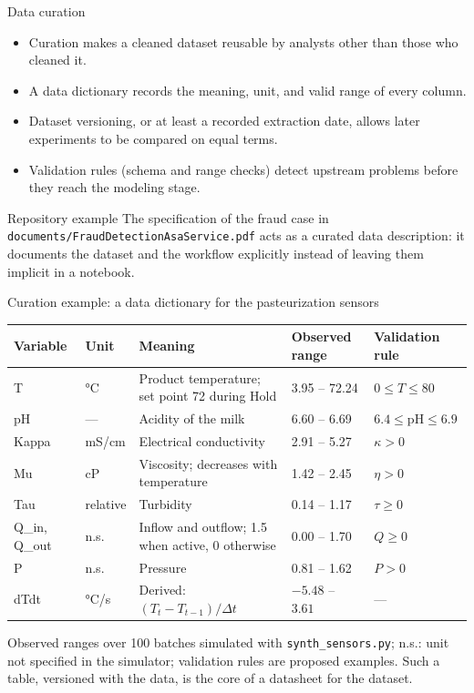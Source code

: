 \begin{frame}{Data curation}
\begin{itemize}
\item Curation makes a cleaned dataset reusable by analysts other than those who cleaned it.
\item A data dictionary records the meaning, unit, and valid range of every column.
\item Dataset versioning, or at least a recorded extraction date, allows later experiments to be compared on equal terms.
\item Validation rules (schema and range checks) detect upstream problems before they reach the modeling stage.
\end{itemize}
\begin{block}{Repository example}
The specification of the fraud case in \texttt{documents/FraudDetectionAsaService.pdf} acts as a curated data description: it documents the dataset and the workflow explicitly instead of leaving them implicit in a notebook.
\end{block}
\coursefooter
\end{frame}

\begin{frame}{Curation example: a data dictionary for the pasteurization sensors}
\begingroup\footnotesize
\renewcommand{\arraystretch}{1.2}
\begin{tabularx}{\textwidth}{>{\ttfamily}l l >{\raggedright\arraybackslash}X l l}
\normalfont\bfseries Variable & \bfseries Unit & \bfseries Meaning & \bfseries Observed range & \bfseries Validation rule \\
\toprule
T & °C & Product temperature; set point 72 during Hold & 3.95 -- 72.24 & $0 \le T \le 80$ \\
pH & --- & Acidity of the milk & 6.60 -- 6.69 & $6.4 \le \mathrm{pH} \le 6.9$ \\
Kappa & mS/cm & Electrical conductivity & 2.91 -- 5.27 & $\kappa > 0$ \\
Mu & cP & Viscosity; decreases with temperature & 1.42 -- 2.45 & $\eta > 0$ \\
Tau & relative & Turbidity & 0.14 -- 1.17 & $\tau \ge 0$ \\
Q\_in, Q\_out & n.s. & Inflow and outflow; 1.5 when active, 0 otherwise & 0.00 -- 1.70 & $Q \ge 0$ \\
P & n.s. & Pressure & 0.81 -- 1.62 & $P > 0$ \\
dTdt & °C/s & Derived: $(T_t - T_{t-1})/\Delta t$ & $-5.48$ -- $3.61$ & --- \\
\bottomrule
\end{tabularx}
\par\endgroup
\vspace{0.4em}
{\scriptsize Observed ranges over 100 batches simulated with \texttt{synth\_sensors.py}; n.s.: unit not specified in the simulator; validation rules are proposed examples. Such a table, versioned with the data, is the core of a datasheet for the dataset.\par}
\coursefooter
\end{frame}

